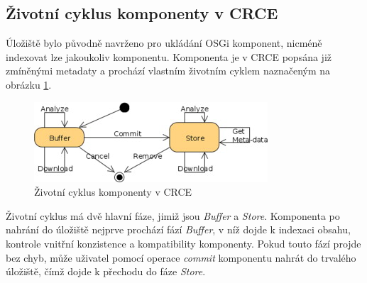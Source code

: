 \documentclass[czech,DP]{thesiskiv}
\begin{document}

\subsection{Životní cyklus komponenty v CRCE}

Úložiště bylo původně navrženo pro ukládání OSGi komponent, nicméně indexovat lze jakoukoliv komponentu. Komponenta je v CRCE popsána již zmíněnými metadaty a prochází vlastním životním cyklem naznačeným na obrázku \ref{fig:crce-comp-lc}.

\begin{figure}[h]
	\centering
	\includegraphics{crce-component-lc.jpg}
	\caption{Životní cyklus komponenty v CRCE}
	\label{fig:crce-comp-lc}
\end{figure} 

Životní cyklus má dvě hlavní fáze, jimiž jsou \textit{Buffer} a \textit{Store}. Komponenta po nahrání do úložiště nejprve prochází fází \textit{Buffer}, v níž dojde k indexaci obsahu, kontrole vnitřní konzistence a kompatibility komponenty. Pokud touto fází projde bez chyb, může uživatel pomocí operace \textit{commit} komponentu nahrát do trvalého úložiště, čímž dojde k přechodu  do fáze \textit{Store}.
\end{document}
